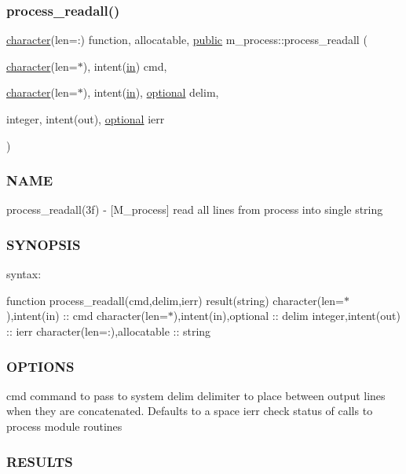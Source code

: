 \subsubsection{\texorpdfstring{process\+\_\+readall()}{process\_readall()}}
{\footnotesize\ttfamily \hyperlink{option__stopwatch_83_8txt_abd4b21fbbd175834027b5224bfe97e66}{character}(len=\+:) function, allocatable, \hyperlink{M__stopwatch_83_8txt_a2f74811300c361e53b430611a7d1769f}{public} m\+\_\+process\+::process\+\_\+readall (\begin{DoxyParamCaption}\item[{\hyperlink{option__stopwatch_83_8txt_abd4b21fbbd175834027b5224bfe97e66}{character}(len=$\ast$), intent(\hyperlink{M__journal_83_8txt_afce72651d1eed785a2132bee863b2f38}{in})}]{cmd,  }\item[{\hyperlink{option__stopwatch_83_8txt_abd4b21fbbd175834027b5224bfe97e66}{character}(len=$\ast$), intent(\hyperlink{M__journal_83_8txt_afce72651d1eed785a2132bee863b2f38}{in}), \hyperlink{option__stopwatch_83_8txt_aa4ece75e7acf58a4843f70fe18c3ade5}{optional}}]{delim,  }\item[{integer, intent(out), \hyperlink{option__stopwatch_83_8txt_aa4ece75e7acf58a4843f70fe18c3ade5}{optional}}]{ierr }\end{DoxyParamCaption})}



\subsubsection*{N\+A\+ME}

process\+\_\+readall(3f) -\/ \mbox{[}M\+\_\+process\mbox{]} read all lines from process into single string \subsubsection*{S\+Y\+N\+O\+P\+S\+IS}

syntax\+:

function process\+\_\+readall(cmd,delim,ierr) result(string) character(len=$\ast$),intent(in) \+:\+: cmd character(len=$\ast$),intent(in),optional \+:\+: delim integer,intent(out) \+:\+: ierr character(len=\+:),allocatable \+:\+: string \subsubsection*{O\+P\+T\+I\+O\+NS}

cmd command to pass to system delim delimiter to place between output lines when they are concatenated. Defaults to a space ierr check status of calls to process module routines \subsubsection*{R\+E\+S\+U\+L\+TS}

